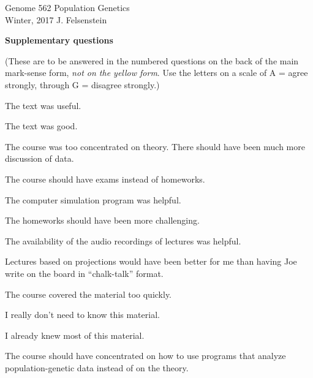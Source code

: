 \documentclass[11pt]{article}
\begin{document}
{\parindent=0in
Genome 562 \hfill  Population Genetics \\
Winter, 2017 \hfill  J. Felsenstein
\vfill

\centerline{\bf \Large Supplementary questions}
\bigskip

(These are to be answered in the numbered questions on the back of the main
mark-sense form, {\it not on
the yellow form}.  Use the letters on a scale of A = agree strongly, through G = disagree
strongly.)
\bigskip

\begin{enumerate}
{\Large
\item The text was useful.
\item The text was good.
\item The course was too concentrated on theory.  There should have been much
more discussion of data.
\item The course should have exams instead of homeworks.
\item The computer simulation program was helpful.
\item The homeworks should have been more challenging.
\item The availability of the audio recordings of lectures was helpful.
\item Lectures based on projections would have been better for me than having
Joe write on the board in ``chalk-talk'' format.
\item The course covered the material too quickly.
\item I really don't need to know this material.
\item I already knew most of this material.
\item The course should have concentrated on how to use programs that analyze
population-genetic data instead of on the theory.
}
\end{enumerate}
}
\vfill

\vfill
\end{document}
